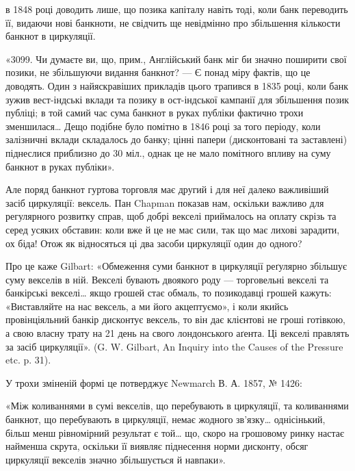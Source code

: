 \parcont{}  %
в 1848 році доводить лише, що позика капіталу навіть тоді, коли банк переводить
її, видаючи нові банкноти, не свідчить ще невідмінно про збільшення
кількости банкнот в циркуляції.

«3099. Чи думаєте ви, що, прим., Англійський банк міг би значно поширити
свої позики, не збільшуючи видання банкнот? — Є понад міру фактів, що
це доводять. Один з найяскравіших прикладів цього трапився в 1835 році, коли
банк зужив вест-індські вклади та позику в ост-індської кампанії для збільшення
позик публіці; в той самий час сума банкнот в руках публіки фактично
трохи зменшилася\dots{} Дещо подібне було помітно в 1846 році за того періоду,
коли залізничні вклади складалось до банку; цінні папери (дисконтовані та
заставлені) піднеслися приблизно до 30 міл., однак це не мало помітного
впливу на суму банкнот в руках публіки».

Але поряд банкнот гуртова торговля має другий і для неї далеко важливіший
засіб циркуляції: вексель. Пан Chapman показав нам, оскільки важливо
для регулярного розвитку справ, щоб добрі векселі приймалось на оплату скрізь
та серед усяких обставин: коли вже й це не має сили, так що має лихові
зарадити, ох біда! Отож як відносяться ці два засоби циркуляції один до одного?

Про це каже Gilbart: «Обмеження суми банкнот в циркуляції реґулярно
збільшує суму векселів в ній. Векселі бувають двоякого роду — торговельні
векселі та банкірські векселі\dots{} якщо грошей стає обмаль, то позикодавці
грошей кажуть: «Виставляйте на нас вексель, а ми його акцептуємо», і коли
якийсь провінціяльний банкір дисконтує вексель, то він дає клієнтові не гроші
готівкою, а свою власну трату на 21 день на свого лондонського аґента. Ці
векселі правлять за засіб циркуляції». (G. W. Gilbart, An Inquiry into the Causes
of the Pressure etc. p. 31).

У трохи зміненій формі це потверджує Newmarch В. А. 1857, № 1426:

«Між коливаннями в сумі векселів, що перебувають в циркуляції, та
коливаннями банкнот, що перебувають в циркуляції, немає жодного зв’язку\dots{}
однісінький, більш менш рівномірний результат є той\dots{} що, скоро на грошовому
ринку настає найменша скрута, оскільки її виявляє піднесення норми дисконту,
обсяг циркуляції векселів значно збільшується й навпаки».

